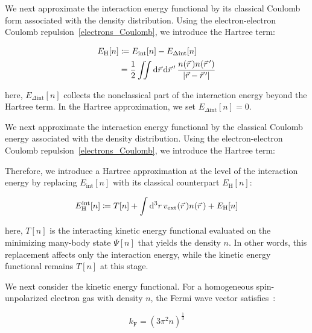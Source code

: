 We next approximate the interaction energy functional by its classical Coulomb form associated with the density distribution.
Using the electron-electron Coulomb repulsion~\eqref{electrons_Coulomb}, we introduce the Hartree term:

\begin{equation}
\begin{aligned}
    E_\mathrm{H}[n] &\coloneqq E_\mathrm{int}[n]-E_{\Delta\mathrm{int}}[n] \\
    &= \frac{1}{2}\iint\mathrm{d}{\vec{r}}\,\mathrm{d}{\vec{r}\,'}\,\frac{n(\vec{r}\,)n(\vec{r}\,')}{|\vec{r}-\vec{r}\,'|}
\label{hartree_term_functional}
\end{aligned}
\end{equation}

here, $E_{\Delta\mathrm{int}}[n]$ collects the nonclassical part of the interaction energy beyond the Hartree term.
In the Hartree approximation, we set $E_{\Delta\mathrm{int}}[n]=0$.

We next approximate the interaction energy functional by the classical Coulomb energy associated with the density distribution.
Using the electron-electron Coulomb repulsion~\eqref{electrons_Coulomb}, we introduce the Hartree term:

Therefore, we introduce a Hartree approximation at the level of the interaction energy by replacing $E_\mathrm{int}[n]$ with its classical counterpart $E_\mathrm{H}[n]$:

\begin{equation}
    E_\mathrm{H}^{\mathrm{int}}[n]
    \coloneqq T[n]
    + \int \mathrm{d}^3{r}\,v_\mathrm{ext}(\vec{r}\,)n(\vec{r}\,)
    + E_\mathrm{H}[n]
\label{hartree_interaction_level_energy}
\end{equation}

here, $T[n]$ is the interacting kinetic energy functional evaluated on the minimizing many-body state $\Psi[n]$ that yields the density $n$.
In other words, this replacement affects only the interaction energy, while the kinetic energy functional remains $T[n]$ at this stage.

We next consider the kinetic energy functional.
For a homogeneous spin-unpolarized electron gas with density $n$,
the Fermi wave vector satisfies~\cite{simon2013oxford}:

\begin{equation}
    k_\mathrm{F} = \left(3\pi^2 n\right)^{\frac{1}{3}}
\label{Fermi_wave_vector_homogeneous_gas}
\end{equation}

